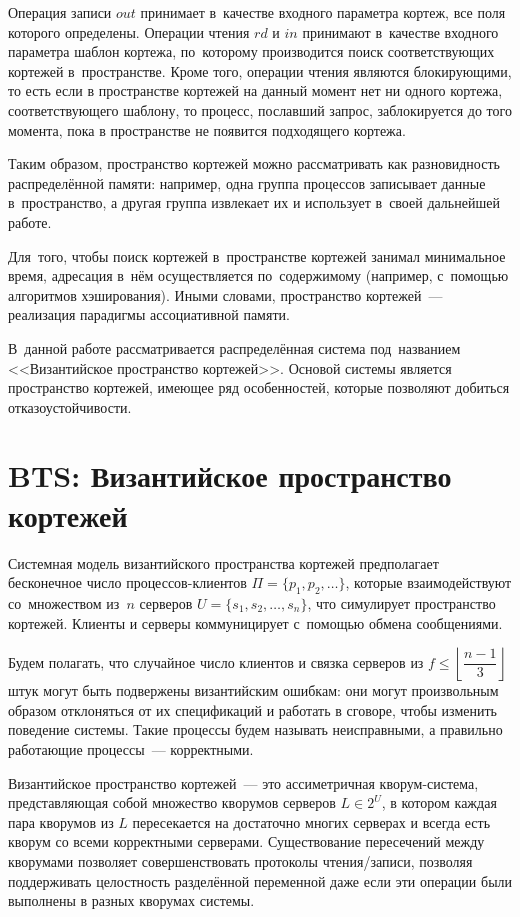 Операция записи $out$ принимает в~качестве входного параметра кортеж, все поля которого определены. Операции чтения $rd$ и $in$ принимают в~качестве входного параметра шаблон кортежа, по~которому производится поиск соответствующих кортежей в~пространстве. Кроме того, операции чтения являются блокирующими, то есть если в пространстве кортежей на данный момент нет ни одного кортежа, соответствующего шаблону, то процесс, пославший запрос, заблокируется до того момента, пока в пространстве не появится подходящего кортежа.

Таким образом, пространство кортежей можно рассматривать как разновидность распределённой памяти: например, одна группа процессов записывает данные в~пространство, а другая группа извлекает их и использует в~своей дальнейшей работе.

Для~того, чтобы поиск кортежей в~пространстве кортежей занимал минимальное время, адресация в~нём осуществляется по~содержимому (например, с~помощью алгоритмов хэширования). Иными словами, пространство кортежей~--- реализация парадигмы ассоциативной памяти.

В~данной работе рассматривается распределённая система под~названием <<Византийское пространство кортежей>>. Основой системы является пространство кортежей, имеющее ряд особенностей, которые позволяют добиться отказоустойчивости.

\section{BTS: Византийское пространство кортежей}\label{sec:5}
Системная модель византийского пространства кортежей предполагает бесконечное число процессов-клиентов $\Pi = \{p_1, p_2, \dots\}$, которые взаимодействуют со~множеством из~$n$ серверов $U = \{s_1, s_2, \dots, s_n\}$, что симулирует пространство кортежей. Клиенты и серверы коммуницирует с~помощью обмена сообщениями.

Будем полагать, что случайное число клиентов и связка серверов из $f \leqslant \left\lfloor \dfrac{n-1}{3} \right\rfloor$ штук могут быть подвержены византийским ошибкам: они могут произвольным образом отклоняться от их спецификаций и работать в сговоре, чтобы изменить поведение системы. Такие процессы будем называть неисправными, а правильно работающие процессы~--- корректными.

Византийское пространство кортежей~--- это ассиметричная кворум-система, представляющая собой множество кворумов серверов $L \in 2^{U}$, в котором каждая пара кворумов из $L$ пересекается на достаточно многих серверах и всегда есть кворум со всеми корректными серверами. Существование пересечений между кворумами позволяет совершенствовать протоколы чтения/записи, позволяя поддерживать целостность разделённой переменной даже если эти операции были выполнены в разных кворумах системы.

